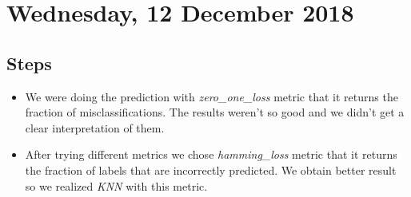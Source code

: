 \section{Wednesday, 12 December 2018}

\subsection{Steps}
\begin{itemize}

	\item We were doing the prediction with \textit{zero\_one\_loss} metric that it returns the fraction of misclassifications. The results weren't so good and we didn't get a clear interpretation of them.
	
	\item After trying different metrics we chose \textit{hamming\_loss} metric that it returns the fraction of labels that are incorrectly predicted. We obtain better result so we realized \textit{KNN} with this metric.
	
\end{itemize}